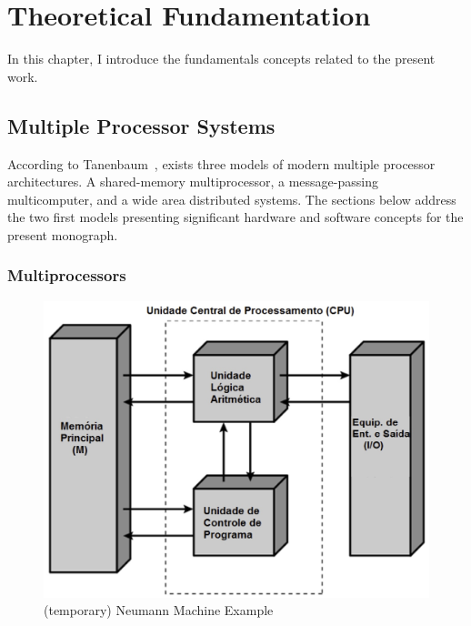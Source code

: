 \chapter{Theoretical Fundamentation} %
\label{ch::fundamentation}

	In this chapter, I introduce the fundamentals concepts related to the present work.



\section{Multiple Processor Systems}
\label{sec::multiple_processor_systems}

	According to Tanenbaum~\cite{tanenbaum:4ed}, exists three models of modern
	multiple processor architectures.
	A shared-memory multiprocessor, a message-passing multicomputer, and a wide
	area distributed systems.
	The sections below address the two first models presenting significant
	hardware and software concepts for the present monograph.

	\subsection{Multiprocessors}
	\label{sec::multiprocessors}

		\begin{figure}[h]
			\centering
			\includegraphics[width=.6\textwidth]{images/neumann.jpg}

			\caption{
				(temporary) Neumann Machine Example
			}\par
			\label{fig::neumann}
		\end{figure}

